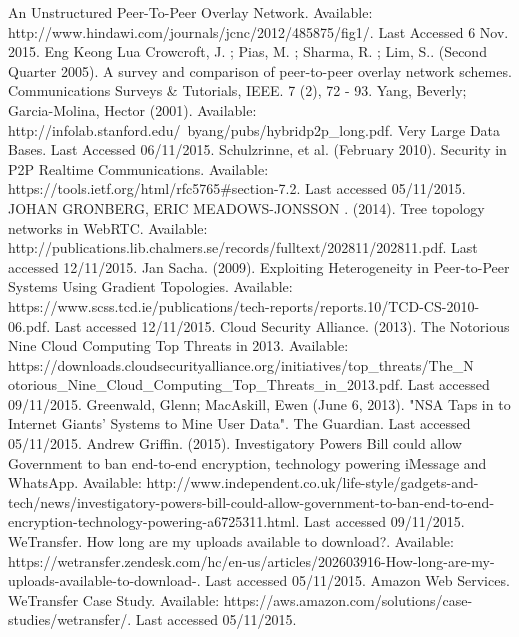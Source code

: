 \documentclass[]{report}
\begin{document}
	\begin{thebibliography}{20}
		An Unstructured Peer-To-Peer Overlay Network. Available: http://www.hindawi.com/journals/jcnc/2012/485875/fig1/. Last Accessed 6 Nov. 2015.
		Eng Keong Lua Crowcroft, J. ; Pias, M. ; Sharma, R. ; Lim, S.. (Second Quarter 2005). A survey and comparison of peer-to-peer overlay network schemes. Communications Surveys \& Tutorials, IEEE. 7 (2), 72 - 93.
		Yang, Beverly; Garcia-Molina, Hector (2001). Available: http://infolab.stanford.edu/~byang/pubs/hybridp2p\_long.pdf. Very Large Data Bases. Last Accessed 06/11/2015.
		Schulzrinne, et al. (February 2010). Security in P2P Realtime Communications. Available: https://tools.ietf.org/html/rfc5765\#section-7.2. Last accessed 05/11/2015.
		JOHAN GRONBERG, ERIC MEADOWS-JONSSON . (2014). Tree topology networks in WebRTC. Available: http://publications.lib.chalmers.se/records/fulltext/202811/202811.pdf. Last accessed 12/11/2015.
		Jan Sacha. (2009). Exploiting Heterogeneity in Peer-to-Peer Systems Using Gradient Topologies. Available: https://www.scss.tcd.ie/publications/tech-reports/reports.10/TCD-CS-2010-06.pdf. Last accessed 12/11/2015.
		Cloud Security Alliance. (2013). The Notorious Nine Cloud Computing Top Threats in 2013. Available: https://downloads.cloudsecurityalliance.org/initiatives/top\_threats/The\_N\\otorious\_Nine\_Cloud\_Computing\_Top\_Threats\_in\_2013.pdf. Last accessed 09/11/2015.
		Greenwald, Glenn; MacAskill, Ewen (June 6, 2013). "NSA Taps in to Internet Giants' Systems to Mine User Data". The Guardian.  Last accessed 05/11/2015.
		Andrew Griffin. (2015). Investigatory Powers Bill could allow Government to ban end-to-end encryption, technology powering iMessage and WhatsApp. Available: http://www.independent.co.uk/life-style/gadgets-and-tech/news/investigatory-powers-bill-could-allow-government-to-ban-end-to-end-encryption-technology-powering-a6725311.html. Last accessed 09/11/2015.
		WeTransfer. How long are my uploads available to download?. Available: https://wetransfer.zendesk.com/hc/en-us/articles/202603916-How-long-are-my-uploads-available-to-download-. Last accessed 05/11/2015.
		Amazon Web Services. WeTransfer Case Study. Available: https://aws.amazon.com/solutions/case-studies/wetransfer/. Last accessed 05/11/2015.

\end{thebibliography}
\end{document}
